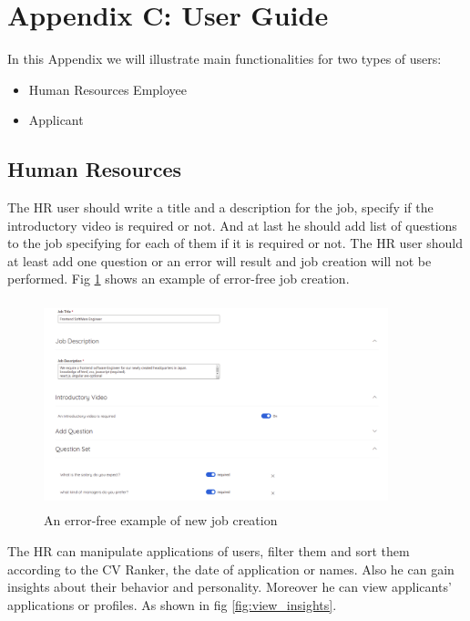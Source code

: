 \newpage
\section*{Appendix C: User Guide}

In this Appendix we will illustrate main functionalities for two types of users:
\begin{itemize}
    \item Human Resources Employee
    \item Applicant
\end{itemize}

\subsection*{Human Resources}

The HR user should write a title and a description for the job, specify if the introductory video is required or not. And at last he should add list of questions to the job specifying for each of them if it is required or not. The HR user should at least add one question or an error will result and job creation will not be performed. Fig \ref{fig:create_job_correct} shows an example of error-free job creation.


\begin{figure}[h!]
\centering
\includegraphics[width=10cm,height=6cm, frame]{images/create.png}
\caption{An error-free example of new job creation}
\label{fig:create_job_correct}
\end{figure}


The HR can manipulate applications of users, filter them and sort them according to the CV Ranker, the date of application or names. Also he can gain insights about their behavior and personality. Moreover he can view applicants' applications or profiles. As shown in fig  \ref{fig:view_insights}.


